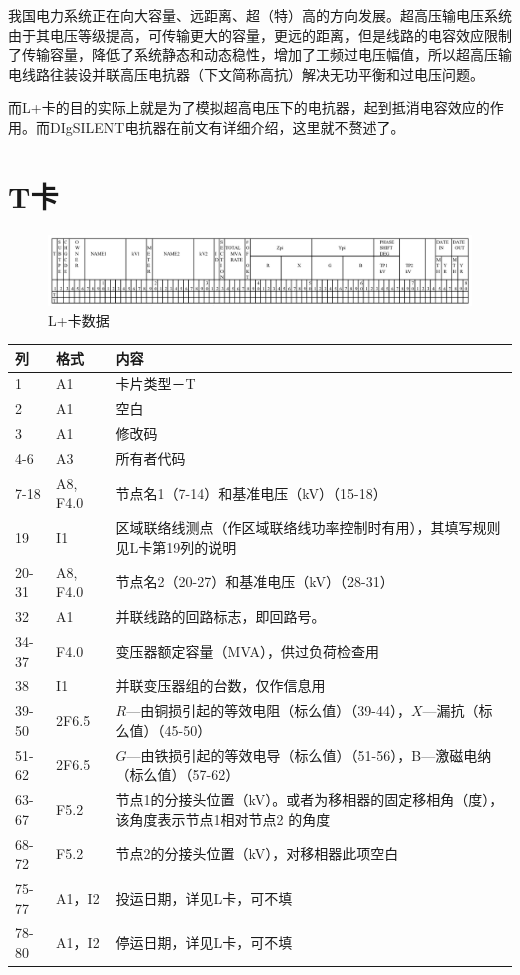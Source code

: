 我国电力系统正在向大容量、远距离、超（特）高的方向发展。超高压输电压系统由于其电压等级提高，可传输更大的容量，更远的距离，但是线路的电容效应限制了传输容量，降低了系统静态和动态稳性，增加了工频过电压幅值，所以超高压输电线路往装设并联高压电抗器（下文简称高抗）解决无功平衡和过电压问题。

而L+卡的目的实际上就是为了模拟超高电压下的电抗器，起到抵消电容效应的作用。而DIgSILENT电抗器在前文有详细介绍，这里就不赘述了。

\section{T卡}

\begin{figure}[H]
\centering
\includegraphics[width=1.05\textwidth]{images/Paper_Fig_46.png}
\setcaptionwidth{\linewidth}
\caption{L+卡数据}
\end{figure}

\begin{spacing}{1.0}
\begin{longtable}[h]{llp{}}
\toprule
列 & 格式 & 内容\\
 \midrule
1 & A1 & 卡片类型－T\\
2 & A1 & 空白\\ 
3 & A1 & 修改码 \\
4-6 & A3 & 所有者代码 \\
7-18 & A8, F4.0 & 节点名1（7-14）和基准电压（kV）（15-18） \\
19 & I1 & 区域联络线测点（作区域联络线功率控制时有用），其填写规则见L卡第19列的说明 \\
20-31& A8, F4.0 & 节点名2（20-27）和基准电压（kV）（28-31）\\ 
32 & A1 & 并联线路的回路标志，即回路号。 \\
34-37	& F4.0 & 变压器额定容量（MVA），供过负荷检查用 \\
38	 	 &I1 & 并联变压器组的台数，仅作信息用 \\
39-50 	 &2F6.5& $R$—由铜损引起的等效电阻（标么值）（39-44），$X$—漏抗（标么值）（45-50） \\
51-62	 &2F6.5 &$G$—由铁损引起的等效电导（标么值）（51-56），B—激磁电纳（标么值）（57-62） \\
63-67	 &F5.2  &节点1的分接头位置（kV）。或者为移相器的固定移相角（度），该角度表示节点1相对节点2 的角度 \\
68-72	& F5.2  &节点2的分接头位置（kV），对移相器此项空白 \\
75-77	& A1，I2&  投运日期，详见L卡，可不填 \\
78-80 	& A1，I2  &停运日期，详见L卡，可不填\\
\bottomrule
\end{longtable}
\end{spacing}

